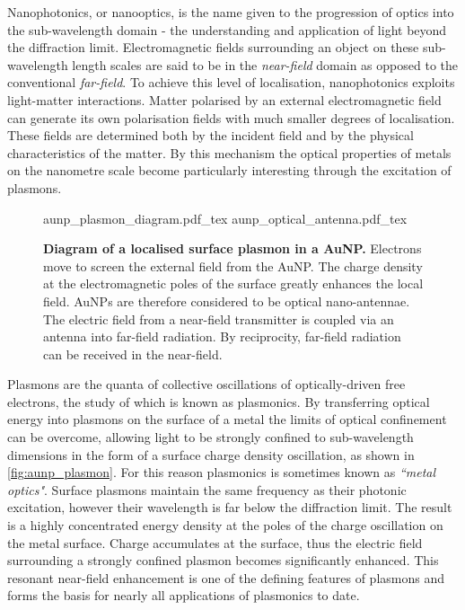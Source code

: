\documentclass[12pt, a4paper, twoside]{book}
\begin{document}
Nanophotonics, or nanooptics, is the name given to the progression of optics into the sub-wavelength domain - the understanding and application of light beyond the diffraction limit. Electromagnetic fields surrounding an object on these sub-wavelength length scales are said to be in the \emph{near-field} domain as opposed to the conventional \emph{far-field}. To achieve this level of localisation, nanophotonics exploits light-matter interactions. Matter polarised by an external electromagnetic field can generate its own polarisation fields with much smaller degrees of localisation. These fields are determined both by the incident field and by the physical characteristics of the matter. By this mechanism the optical properties of metals on the nanometre scale become particularly interesting through the excitation of plasmons.

\begin{figure}[bt]
\centering
\fontsize{10pt}{1em}\selectfont
\def\svgwidth{0.6\textwidth}
{aunp_plasmon_diagram.pdf_tex}
\def\svgwidth{0.35\textwidth}
{aunp_optical_antenna.pdf_tex}
\caption[Diagram of a localised surface plasmon in a AuNP.]{\textbf{Diagram of a localised surface plasmon in a AuNP.} Electrons move to screen the external field from the AuNP. The charge density at the electromagnetic poles of the surface greatly enhances the local field. AuNPs are therefore considered to be optical nano-antennae. The electric field from a near-field transmitter is coupled via an antenna into far-field radiation. By reciprocity, far-field radiation can be received in the near-field.}
\label{fig:aunp_plasmon}
\end{figure}

Plasmons are the quanta of collective oscillations of optically-driven free electrons, the study of which is known as plasmonics. By transferring optical energy into plasmons on the surface of a metal the limits of optical confinement can be overcome, allowing light to be strongly confined to sub-wavelength dimensions in the form of a surface charge density oscillation, as shown in \autoref{fig:aunp_plasmon}. For this reason plasmonics is sometimes known as \emph{``metal optics"}. Surface plasmons maintain the same frequency as their photonic excitation, however their wavelength is far below the diffraction limit. The result is a highly concentrated energy density at the poles of the charge oscillation on the metal surface. Charge accumulates at the surface, thus the electric field surrounding a strongly confined plasmon becomes significantly enhanced. This resonant near-field enhancement is one of the defining features of plasmons and forms the basis for nearly all applications of plasmonics to date.
\end{document}
